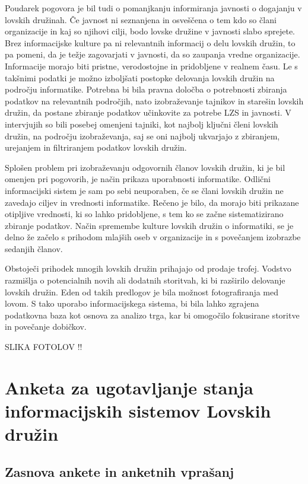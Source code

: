 \documentclass[a4paper,12pt,openright]{book}
\begin{document}
Poudarek pogovora je bil tudi o pomanjkanju informiranja javnosti o dogajanju v lovskih družinah. 
Če javnost ni seznanjena in osveščena o tem kdo so člani organizacije in kaj so njihovi cilji, bodo lovske družine v javnosti slabo sprejete.
Brez informacijske kulture pa ni relevantnih informacij o delu lovskih družin, to pa pomeni, da je težje zagovarjati v javnosti, da so zaupanja vredne organizacije.
Informacije morajo biti pristne, verodostojne in pridobljene v realnem času.
Le s takšnimi podatki je možno izboljšati postopke delovanja lovskih družin na področju informatike.
Potrebna bi bila pravna določba o potrebnosti zbiranja podatkov na relevantnih področjih, nato izobraževanje tajnikov in starešin lovskih družin, da postane zbiranje podatkov učinkovite za potrebe LZS in javnosti.
V intervjujih so bili  posebej omenjeni tajniki, kot najbolj ključni členi lovskih družin, na področju izobraževanja, saj se oni  najbolj ukvarjajo z zbiranjem, urejanjem in filtriranjem podatkov lovskih družin.  

Splošen problem pri izobraževanju odgovornih članov lovskih družin, ki je bil omenjen pri pogovorih, je način prikaza uporabnosti informatike. 
Odlični informacijski sistem je sam po sebi neuporaben, če se člani lovskih družin ne zavedajo ciljev in vrednosti informatike. 
Rečeno je bilo, da morajo biti prikazane otipljive vrednosti, ki so lahko pridobljene, s tem ko se začne sistematizirano zbiranje podatkov. 
Način spremembe kulture lovskih družin o informatiki, se je delno že začelo s prihodom mlajših oseb v organizacije in s povečanjem izobrazbe sedanjih članov.

Obstoječi prihodek mnogih lovskih družin prihajajo od prodaje trofej. 
Vodstvo razmišlja o potencialnih novih ali dodatnih storitvah, ki bi razširilo delovanje lovskih družin. 
Eden od takih predlogov je bila možnost fotografiranja med lovom. 
S tako uporabo informacijskega sistema, bi bila lahko zgrajena podatkovna baza kot osnova za analizo trga, kar bi omogočilo fokusirane storitve in povečanje dobičkov. 

SLIKA FOTOLOV !!





\chapter{Anketa za ugotavljanje stanja informacijskih sistemov Lovskih družin}
\label{anketa}

\section{Zasnova ankete in anketnih vprašanj}
\end{document}
